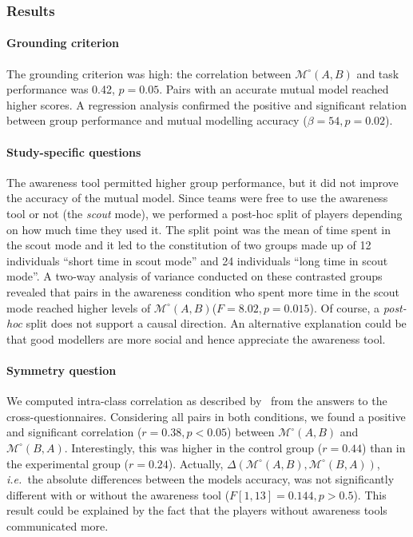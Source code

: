 \documentclass[natbib]{svjour3}
\newcommand{\ie}{{\textit{i.e.\ }}}
\newcommand{\gModel}[2]{{$\mathcal{M}^{\circ}(#1, #2)$}}
\newcommand{\gMdeg}[2]{{\mathcal{M}^{\circ}(#1, #2)}}
\begin{document}
\subsubsection*{Results}

\paragraph{Grounding criterion} The grounding criterion was high: the
correlation between \gModel{A}{B} and task performance was 0.42, $p = 0.05$.
Pairs with an accurate mutual model reached higher scores. A regression analysis
confirmed the positive and significant relation between group performance and
mutual modelling accuracy ($\beta=54, p = 0.02$).

\paragraph{Study-specific questions} The awareness tool permitted higher group
performance, but it did not improve the accuracy of the mutual model. Since
teams were free to use the awareness tool or not (the \emph{scout} mode), we
performed a post-hoc split of players depending on how much time they used it.
The split point was the mean of time spent in the scout mode and it led to the
constitution of two groups made up of 12 individuals ``short time in scout
mode'' and 24 individuals ``long time in scout mode''. A two-way analysis of
variance conducted on these contrasted groups revealed that pairs in the
awareness condition who spent more time in the scout mode reached higher levels
of \gModel{A}{B}($F = 8.02, p = 0.015$). Of course, a \textit{post-hoc} split
does not support a causal direction. An alternative explanation could be that
good modellers are more social and hence appreciate the awareness tool.

\paragraph{Symmetry question} We computed intra-class correlation as described
by~\citet{kenny1998data} from the answers to the cross-questionnaires.
Considering all pairs in both conditions, we found a positive and significant
correlation ($r = 0.38, p < 0.05$) between \gModel{A}{B} and \gModel{B}{A}.
Interestingly, this was higher in the control group ($r = 0.44$) than in the
experimental group ($r = 0.24$). Actually, $\Delta(\gMdeg{A}{B},\gMdeg{B}{A})$,
\ie the absolute differences between the models accuracy, was not significantly
different with or without the awareness tool ($F [1,13]= 0.144, p > 0.5$). This
result could be explained by the fact that the players without awareness tools
communicated more.
\end{document}
